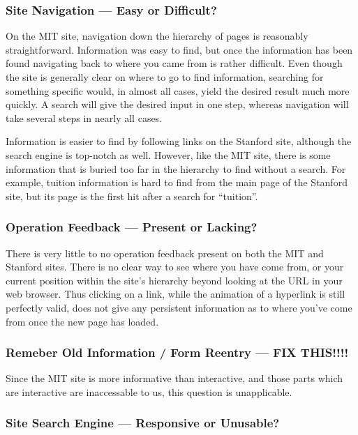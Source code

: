 \subsubsection*{Site Navigation --- Easy or Difficult?}

On the MIT site, navigation down the hierarchy of pages is reasonably straightforward.
Information was easy to find, but once the information has been found navigating back
to where you came from is rather difficult. Even though the site is generally clear on
where to go to find information, searching for something specific would, in almost all
cases, yield the desired result much more quickly. A search will give the desired input
in one step, whereas navigation will take several steps in nearly all cases.

Information is easier to find by following links on the Stanford site, although
the search engine is top-notch as well. However, like the MIT site, there is some
information that is buried too far in the hierarchy to find without a search.
For example, tuition information is hard to find from the main page of the Stanford
site, but its page is the first hit after a search for ``tuition''.

\subsubsection*{Operation Feedback --- Present or Lacking?}

There is very little to no operation feedback present on both the MIT and Stanford sites.
There is no clear way to see where you have come from, or your current
position within the site's hierarchy beyond looking at the URL in your web browser. Thus
clicking on a link, while the animation of a hyperlink is still perfectly valid, does not
give any persistent information as to where you've come from once the new page has loaded.

\subsubsection*{Remeber Old Information / Form Reentry --- FIX THIS!!!!}

Since the MIT site is more informative than interactive, and those parts which are interactive
are inaccessable to us, this question is unapplicable.

\subsubsection*{Site Search Engine --- Responsive or Unusable?}

